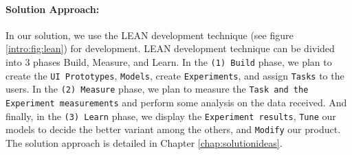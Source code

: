 \paragraph{Solution Approach:} In our solution, we use the LEAN development technique (see figure \ref{intro:fig:lean}) for development. LEAN development technique can be divided into 3 phases Build, Measure, and Learn. 
In the \texttt{(1) Build} phase, we plan to create the \texttt{UI Prototypes}, \texttt{Models}, create \texttt{Experiments}, and assign \texttt{Tasks} to the users. 
In the \texttt{(2) Measure} phase, we plan to measure the \texttt{Task and the Experiment measurements} and perform some analysis on the data received. 
And finally, in the \texttt{(3) Learn} phase, we display the \texttt{Experiment results}, \texttt{Tune} our models to decide the better variant among the others, and \texttt{Modify} our product. The solution approach is detailed in Chapter \ref{chap:solutionideas}.